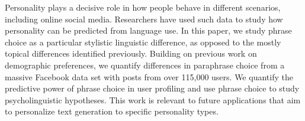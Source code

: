 Personality plays a decisive role in how people behave in different scenarios, including online social media. Researchers have used such data to study how personality can be predicted from language use. In this paper, we study phrase choice as a particular stylistic linguistic difference, as opposed to the mostly topical differences identified previously. Building on previous work on demographic preferences, we quantify differences in paraphrase choice from a massive Facebook data set with posts from over 115,000 users. We quantify the predictive power of phrase choice in user profiling and use phrase choice to study psycholinguistic hypotheses. This work is relevant to future applications that aim to personalize text generation to specific personality types.
